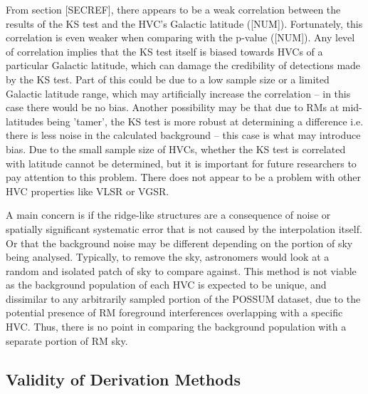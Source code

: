 From section [SECREF], there appears to be a weak correlation between the results of the KS test and the HVC's Galactic latitude ([NUM]). Fortunately, this correlation is even weaker when comparing with the p-value ([NUM]). Any level of correlation implies that the KS test itself is biased towards HVCs of a particular Galactic latitude, which can damage the credibility of detections made by the KS test. Part of this could be due to a low sample size or a limited Galactic latitude range, which may artificially increase the correlation – in this case there would be no bias. Another possibility may be that due to RMs at mid-latitudes being 'tamer', the KS test is more robust at determining a difference i.e. there is less noise in the calculated background – this case is what may introduce bias. Due to the small sample size of HVCs, whether the KS test is correlated with latitude cannot be determined, but it is important for future researchers to pay attention to this problem. There does not appear to be a problem with other HVC properties like VLSR or VGSR.


A main concern is if the ridge-like structures are a consequence of noise or spatially significant systematic error that is not caused by the interpolation itself. Or that the background noise may be different depending on the portion of sky being analysed. Typically, to remove the sky, astronomers would look at a random and isolated patch of sky to compare against. This method is not viable as the background population of each HVC is expected to be unique, and dissimilar to any arbitrarily sampled portion of the POSSUM dataset, due to the potential presence of RM foreground interferences overlapping with a specific HVC. Thus, there is no point in comparing the background population with a separate portion of RM sky.

\subsection{Validity of Derivation Methods}
\label{ssec:B3}

